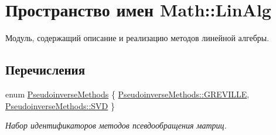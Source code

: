 \hypertarget{namespace_math_1_1_lin_alg}{}\section{Пространство имен Math\+:\+:Lin\+Alg}
\label{namespace_math_1_1_lin_alg}


Модуль, содержащий описание и реализацию методов линейной алгебры.  


\subsection*{Перечисления}
\begin{DoxyCompactItemize}
\item 
enum \hyperlink{namespace_math_1_1_lin_alg_a34ee452c5d64eeb10e1bb63cf887af17}{Pseudoinverse\+Methods} \{ \hyperlink{namespace_math_1_1_lin_alg_a34ee452c5d64eeb10e1bb63cf887af17a9febc190323c06d33ae8d8716f98bfe9}{Pseudoinverse\+Methods\+::\+G\+R\+E\+V\+I\+L\+LE}, 
\hyperlink{namespace_math_1_1_lin_alg_a34ee452c5d64eeb10e1bb63cf887af17a595e2d2f1a68ede96e96f849a85370bc}{Pseudoinverse\+Methods\+::\+S\+VD}
 \}\begin{DoxyCompactList}\small\item\em Набор идентификаторов методов псевдообращения матриц. \end{DoxyCompactList}
\end{DoxyCompactItemize}
